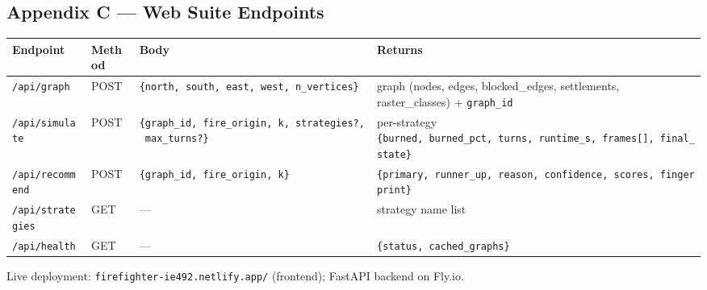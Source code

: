 \documentclass[
  11pt,
]{article}
\newcounter{none} %
\begin{document}
\subsection{Appendix C --- Web Suite
Endpoints}\label{appendix-c-web-suite-endpoints}

{\def\LTcaptype{none} %
\begin{longtable}[]{@{}
  >{\raggedright\arraybackslash}p{}
  >{\raggedright\arraybackslash}p{}
  >{\raggedright\arraybackslash}p{}
  >{\raggedright\arraybackslash}p{}@{}}
\toprule\noalign{}
\begin{minipage}[b]{\linewidth}\raggedright
Endpoint
\end{minipage} & \begin{minipage}[b]{\linewidth}\raggedright
Method
\end{minipage} & \begin{minipage}[b]{\linewidth}\raggedright
Body
\end{minipage} & \begin{minipage}[b]{\linewidth}\raggedright
Returns
\end{minipage} \\
\midrule\noalign{}
\endhead
\bottomrule\noalign{}
\endlastfoot
\texttt{/api/graph} & POST &
\texttt{\{north,\ south,\ east,\ west,\ n\_vertices\}} & graph (nodes,
edges, blocked\_edges, settlements, raster\_classes) +
\texttt{graph\_id} \\
\texttt{/api/simulate} & POST &
\texttt{\{graph\_id,\ fire\_origin,\ k,\ strategies?,\ max\_turns?\}} &
per-strategy
\texttt{\{burned,\ burned\_pct,\ turns,\ runtime\_s,\ frames{[}{]},\ final\_state\}} \\
\texttt{/api/recommend} & POST &
\texttt{\{graph\_id,\ fire\_origin,\ k\}} &
\texttt{\{primary,\ runner\_up,\ reason,\ confidence,\ scores,\ fingerprint\}} \\
\texttt{/api/strategies} & GET & --- & strategy name list \\
\texttt{/api/health} & GET & --- &
\texttt{\{status,\ cached\_graphs\}} \\
\end{longtable}
}

Live deployment: \texttt{firefighter-ie492.netlify.app/} (frontend);
FastAPI backend on Fly.io.
\end{document}
